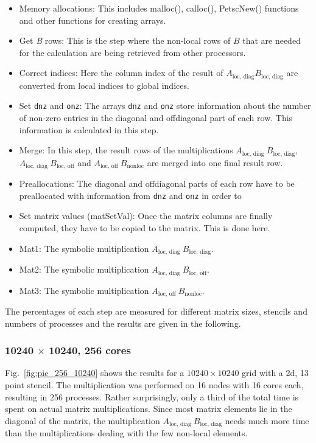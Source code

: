 \begin{itemize}
\item Memory allocations: This includes malloc(), calloc(), PetscNew() functions and other functions for creating arrays.
\item Get \textit{B} rows: This is the step where the non-local rows of $B$ that are needed for the calculation are being retrieved from other processors.
\item Correct indices: Here the column index of the result of $A_{\textrm{loc, diag}} B_{\textrm{loc, diag}}$ are converted from local indices to global indices.
\item Set \texttt{dnz} and \texttt{onz}: The arrays \texttt{dnz} and \texttt{onz} store information about the number of non-zero entries in the diagonal and offdiagonal part of each row. This information is calculated in this step. 
\item Merge: In this step, the result rows of the multiplications $A_{\textrm{loc, diag~}} B_{\textrm{loc, diag}}$,   \\$A_{\textrm{loc, diag~}} B_{\textrm{loc, off}}$ and $A_{\textrm{loc, off~}} B_{\textrm{nonloc}}$ are merged into one final result row.
\item Preallocations: The diagonal and offdiagonal parts of each row have to be preallocated with information from \texttt{dnz} and \texttt{onz} in order to 
\item Set matrix values (matSetVal): Once the matrix columns are finally computed, they have to be copied to the matrix. This is done here.
\item Mat1: The symbolic multiplication $A_{\textrm{loc, diag~}} B_{\textrm{loc, diag}}$.
\item Mat2: The symbolic multiplication $A_{\textrm{loc, diag~}} B_{\textrm{loc, off}}$.
\item Mat3: The symbolic multiplication $A_{\textrm{loc, off~}} B_{\textrm{nonloc}}$.
\end{itemize}

The percentages of each step are measured for different matrix sizes, stencils and numbers of processes and the results are given in the following.

\subsubsection*{10240 $\times$ 10240, 256 cores}
Fig.~\ref{fig:pie_256_10240} shows the results for a $10240 \times 10240$ grid with a 2d, 13 point stencil. The multiplication was performed on 16 nodes with 16 cores each, resulting in 256 processes. Rather surprisingly, only a third of the total time is spent on actual matrix multiplications. Since most matrix elements lie in the diagonal of the matrix, the multiplication $A_{\textrm{loc, diag}}~B_{\textrm{loc, diag}}$ needs much more time than the multiplications dealing with the few non-local elements. 

